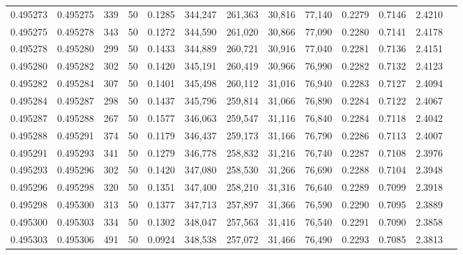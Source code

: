 \begin{tabular}{rrrrrrrrrrrrr}
0.495273 & 0.495275 &   339 &  50 &                                     0.1285 & 344,247 & 261,363 &  30,816 &  77,140 & 0.2279 & 0.7146 & 2.4210 \\
0.495275 & 0.495278 &   343 &  50 &                                     0.1272 & 344,590 & 261,020 &  30,866 &  77,090 & 0.2280 & 0.7141 & 2.4178 \\
0.495278 & 0.495280 &   299 &  50 &                                     0.1433 & 344,889 & 260,721 &  30,916 &  77,040 & 0.2281 & 0.7136 & 2.4151 \\
0.495280 & 0.495282 &   302 &  50 &                                     0.1420 & 345,191 & 260,419 &  30,966 &  76,990 & 0.2282 & 0.7132 & 2.4123 \\
0.495282 & 0.495284 &   307 &  50 &                                     0.1401 & 345,498 & 260,112 &  31,016 &  76,940 & 0.2283 & 0.7127 & 2.4094 \\
0.495284 & 0.495287 &   298 &  50 &                                     0.1437 & 345,796 & 259,814 &  31,066 &  76,890 & 0.2284 & 0.7122 & 2.4067 \\
0.495287 & 0.495288 &   267 &  50 &                                     0.1577 & 346,063 & 259,547 &  31,116 &  76,840 & 0.2284 & 0.7118 & 2.4042 \\
0.495288 & 0.495291 &   374 &  50 &                                     0.1179 & 346,437 & 259,173 &  31,166 &  76,790 & 0.2286 & 0.7113 & 2.4007 \\
0.495291 & 0.495293 &   341 &  50 &                                     0.1279 & 346,778 & 258,832 &  31,216 &  76,740 & 0.2287 & 0.7108 & 2.3976 \\
0.495293 & 0.495296 &   302 &  50 &                                     0.1420 & 347,080 & 258,530 &  31,266 &  76,690 & 0.2288 & 0.7104 & 2.3948 \\
0.495296 & 0.495298 &   320 &  50 &                                     0.1351 & 347,400 & 258,210 &  31,316 &  76,640 & 0.2289 & 0.7099 & 2.3918 \\
0.495298 & 0.495300 &   313 &  50 &                                     0.1377 & 347,713 & 257,897 &  31,366 &  76,590 & 0.2290 & 0.7095 & 2.3889 \\
0.495300 & 0.495303 &   334 &  50 &                                     0.1302 & 348,047 & 257,563 &  31,416 &  76,540 & 0.2291 & 0.7090 & 2.3858 \\
0.495303 & 0.495306 &   491 &  50 &                                     0.0924 & 348,538 & 257,072 &  31,466 &  76,490 & 0.2293 & 0.7085 & 2.3813 \\

\end{tabular}
